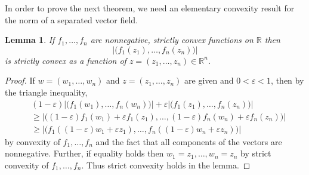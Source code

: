 \documentclass[12pt,reqno]{amsart}
\newtheorem{lemma}[lemma]{Lemma}
\theoremstyle{definition}
\newcommand{\e}{\varepsilon}
\newcommand{\R}{{\mathbb R}}
\newcommand{\Rn}{{\mathbb R}^n}
\begin{document}
In order to prove the next theorem, we need an elementary convexity result for the norm of a separated vector field. 
%
\begin{lemma}\label{convexfield}
If $f_1,\dots,f_n$ are nonnegative, strictly convex functions on $\R$ then 
\[
\left| \big( f_1(z_1),\dots,f_n(z_n) \big) \right|
\]
is strictly convex as a function of $z=(z_1,\dots,z_n) \in \Rn$.
\end{lemma}
%
\begin{proof}
If $w=(w_1,\dots,w_n)$ and $z=(z_1,\dots,z_n)$ are given and $0 < \e < 1$, then by the triangle inequality, 
%
\begin{align*}
& (1-\e)\left| \big( f_1(w_1),\dots,f_n(w_n) \big) \right| + \e \left| \big( f_1(z_1),\dots,f_n(z_n) \big) \right| \\
 & \geq \left| \big( (1-\e)f_1(w_1) + \e f_1(z_1),\dots,(1-\e)f_n(w_n) + \e f_n(z_n) \big) \right| \\
 & \geq \left| \big( f_1((1-\e)w_1+\e z_1),\dots,f_n((1-\e)w_n+\e z_n) \big) \right| 
\end{align*}
%
by convexity of $f_1,\dots,f_n$ and the fact that all components of the vectors are nonnegative. Further, if equality holds then $w_1=z_1,\dots,w_n=z_n$ by  strict convexity of $f_1,\dots,f_n$. Thus strict convexity holds in the lemma. 
\end{proof}
%
\end{document}
